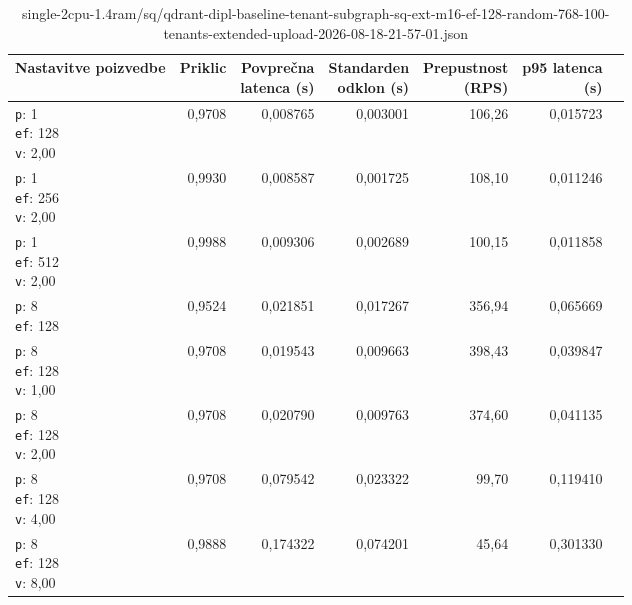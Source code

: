 \begin{table}[htbp]
  \centering
\small
  \caption{single-2cpu-1.4ram/sq/qdrant-dipl-baseline-tenant-subgraph-sq-ext-m16-ef-128-random-768-100-tenants-extended-upload-2026-08-18-21-57-01.json}
  \label{tab:single-2cpu-1.4ram:sq:qdrant-dipl-baseline-tenant-subgraph-sq-ext-m16-ef-128-random-768-100-tenants-extended-upload-2026-08-18-21-57-01.json}
  \begin{tabularx}{\textwidth}{Xrrrrrr}
    \toprule
    Nastavitve poizvedbe & Priklic & \makecell{Povprečna\\latenca (s)} & \makecell{Standarden\\odklon (s)} & \makecell{Prepustnost\\(RPS)} & \makecell{p95 latenca\\(s)}  \\
    \midrule
    \makecell{\texttt{p}: 1\\\texttt{ef}: 128\\\texttt{v}: 2,00} & 0,9708 & 0,008765 & 0,003001 & 106,26 & 0,015723 \\
    \makecell{\texttt{p}: 1\\\texttt{ef}: 256\\\texttt{v}: 2,00} & 0,9930 & 0,008587 & 0,001725 & 108,10 & 0,011246 \\
    \makecell{\texttt{p}: 1\\\texttt{ef}: 512\\\texttt{v}: 2,00} & 0,9988 & 0,009306 & 0,002689 & 100,15 & 0,011858 \\
    \makecell{\texttt{p}: 8\\\texttt{ef}: 128} & 0,9524 & 0,021851 & 0,017267 & 356,94 & 0,065669 \\
    \makecell{\texttt{p}: 8\\\texttt{ef}: 128\\\texttt{v}: 1,00} & 0,9708 & 0,019543 & 0,009663 & 398,43 & 0,039847 \\
    \makecell{\texttt{p}: 8\\\texttt{ef}: 128\\\texttt{v}: 2,00} & 0,9708 & 0,020790 & 0,009763 & 374,60 & 0,041135 \\
    \makecell{\texttt{p}: 8\\\texttt{ef}: 128\\\texttt{v}: 4,00} & 0,9708 & 0,079542 & 0,023322 & 99,70 & 0,119410 \\
    \makecell{\texttt{p}: 8\\\texttt{ef}: 128\\\texttt{v}: 8,00} & 0,9888 & 0,174322 & 0,074201 & 45,64 & 0,301330 \\

\end{tabularx}
\end{table}
